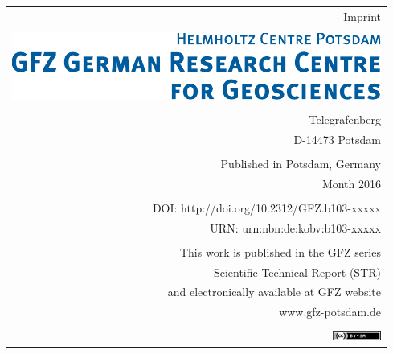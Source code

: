 {{		%
		\begin{flushright}\vfill
			\begin{tabular}{r}
				{\normalsize Imprint} \\
				\\
				\includegraphics{gfzlogo_ur.pdf} \\
				\\
				Telegrafenberg \\
				D-14473 Potsdam  \\ 
				\\
				Published in Potsdam, Germany \\
				Month 2016 \\
				\rstissn \\
				DOI: http://doi.org/10.2312/GFZ.b103-xxxxx \\
				URN: urn:nbn:de:kobv:b103-xxxxx \\
				\\
				This work is published in the GFZ series \\
				Scientific Technical Report (STR) \\
				and electronically available at GFZ website \\
				www.gfz-potsdam.de \\
				\\
				\href{http://creativecommons.org/licenses/by-sa/4.0/}{\includegraphics{creative_common1.png}}
			\end{tabular}
		\end{flushright}
	}
	\thispagestyle{empty}
	\clearpage

	\thispagestyle{empty}
	\clearpage
}